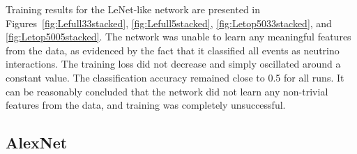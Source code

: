 \documentclass{pracalicmgr}
\begin{document}
\newpage

Training results for the LeNet-like network are presented in Figures~\ref{fig:Lefull33stacked}, \ref{fig:Lefull5stacked}, \ref{fig:Letop5033stacked}, and \ref{fig:Letop5005stacked}. The network was unable to learn any meaningful features from the data, as evidenced by the fact that it classified all events as neutrino interactions. The training loss did not decrease and simply oscillated around a constant value. The classification accuracy remained close to 0.5 for all runs. It can be reasonably concluded that the network did not learn any non-trivial features from the data, and training was completely unsuccessful.

\subsection{AlexNet}
\end{document}
